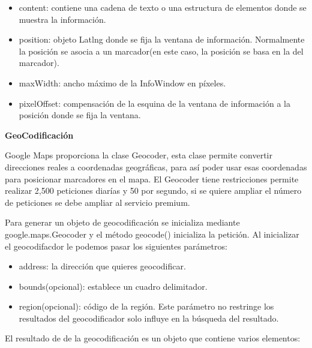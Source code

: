 \begin{itemize}

\item content: contiene una cadena de texto o una estructura de elementos donde se muestra la información.

\item position: objeto Latlng donde se fija la ventana de información. Normalmente la posición se asocia a un marcador(en este caso, la posición se basa en la del marcador).

\item maxWidth: ancho máximo de la InfoWindow en píxeles.

\item pixelOffset: compensación de la esquina de la ventana de información a la posición donde se fija la ventana.

\end{itemize}

\vspace{5 mm}

\textbf{GeoCodificación}

Google Maps proporciona la clase Geocoder, esta clase permite convertir direcciones reales a coordenadas geográficas, para así poder usar esas coordenadas para posicionar marcadores en el mapa. El Geocoder tiene restricciones permite realizar 2,500 peticiones diarías y 50 por segundo, si se quiere ampliar el número de peticiones se debe ampliar al servicio premium.

\vspace{5 mm}

Para generar un objeto de geocodificación se inicializa mediante google.maps.Geocoder y el método geocode() inicializa la petición. Al inicializar el geocodifacdor le podemos pasar los siguientes parámetros:

\begin{itemize}

\item address: la dirección que quieres geocodificar.

\item bounds(opcional): establece un cuadro delimitador.

\item region(opcional): código de la región. Este parámetro no restringe los resultados del geocodificador solo influye en la búsqueda del resultado.

\end{itemize}

El resultado de de la geocodificación es un objeto que contiene varios elementos:


